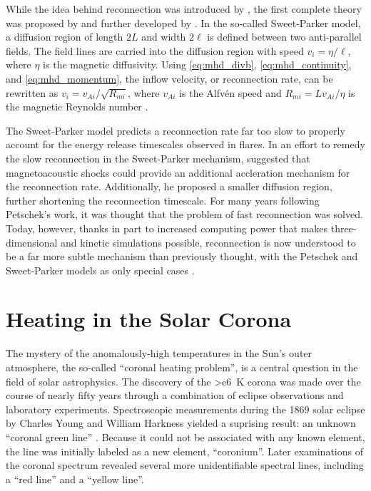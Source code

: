 While the idea behind reconnection was introduced by \citet{dungey_conditions_1953}, the first complete theory was proposed by \citet{sweet_neutral_1958} and further developed by \citet{parker_sweets_1957,parker_solar-flare_1963}. In the so-called Sweet-Parker model, a diffusion region of length $2L$ and width $2\ell$ is defined between two anti-parallel fields. The field lines are carried into the diffusion region with speed $v_i=\eta/\ell$, where $\eta$ is the magnetic diffusivity. Using \autoref{eq:mhd_divb}, \autoref{eq:mhd_continuity}, and \autoref{eq:mhd_momentum}, the inflow velocity, or reconnection rate, can be rewritten as $v_i=v_{Ai}/\sqrt{R_{mi}}$, where $v_{Ai}$ is the Alfv\'{e}n speed and $R_{mi}=Lv_{Ai}/\eta$ is the magnetic Reynolds number \citep{priest_magnetic_2000}. 

The Sweet-Parker model predicts a reconnection rate far too slow to properly account for the energy release timescales observed in flares. In an effort to remedy the slow reconnection in the Sweet-Parker mechanism, \citet{petschek_magnetic_1964} suggested that magnetoacoustic shocks could provide an additional accleration mechanism for the reconnection rate. Additionally, he proposed a smaller diffusion region, further shortening the reconnection timescale. For many years following Petschek's work, it was thought that the problem of fast reconnection was solved. Today, however, thanks in part to increased computing power that makes three-dimensional and kinetic simulations possible, reconnection is now understood to be a far more subtle mechanism than previously thought, with the Petschek and Sweet-Parker models as only special cases \citep{priest_magnetic_2000}.

\section{Heating in the Solar Corona}\label{sec:coronal-heating}

The mystery of the anomalously-high temperatures in the Sun's outer atmosphere, the so-called ``coronal heating problem'', is a central question in the field of solar astrophysics. The discovery of the \SI{>e6}{\kelvin} corona was made over the course of nearly fifty years through a combination of eclipse observations and laboratory experiments. Spectroscopic measurements during the 1869 solar eclipse by Charles Young and William Harkness yielded a suprising result: an unknown ``coronal green line'' \citep{golub_solar_2010}. Because it could not be associated with any known element, the line was initially labeled as a new element, ``coronium''. Later examinations of the coronal spectrum revealed several more unidentifiable spectral lines, including a ``red line'' and a ``yellow line''.

